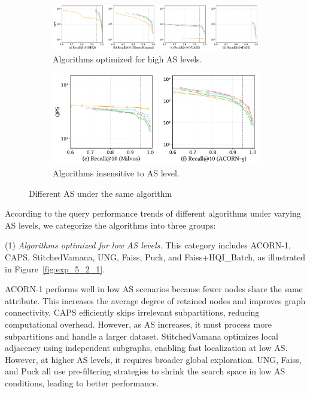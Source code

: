 \documentclass[sigconf, nonacm]{acmart}
\begin{document}
\begin{sloppypar}
\begin{figure}
    \begin{subfigure}{0.66\textwidth} %
        \centering
        \setlength{\abovecaptionskip}{0cm}
        \setlength{\belowcaptionskip}{0cm}
        \includegraphics[width=\textwidth]{figures/exp/exp_5_2_2.pdf}
        \caption{Algorithms optimized for high AS levels.}
        \label{fig:exp_5_2_2}
    \end{subfigure}
    \hfill %
    \begin{subfigure}{0.33\textwidth} %
        \centering
        \setlength{\abovecaptionskip}{0cm}
        \setlength{\belowcaptionskip}{0cm}
        \includegraphics[width=\textwidth]{figures/exp/exp_5_2_3.pdf}
        \caption{Algorithms insensitive to AS level.}
        \label{fig:exp_5_2_3}
    \end{subfigure}
    
    \setlength{\abovecaptionskip}{0cm}
    \setlength{\belowcaptionskip}{-0.4cm}
    \caption{Different AS under the same algorithm}
    \label{fig:exp_5_2_combined}
\end{figure}


According to the query performance trends of different algorithms under varying AS levels, we categorize the algorithms into three groups:

\par
(1) \textit{Algorithms optimized for low AS levels.}  
This category includes ACORN-1, CAPS, StitchedVamana, UNG, Faiss, Puck, and Faiss+HQI\_Batch, as illustrated in Figure~\ref{fig:exp_5_2_1}.

ACORN-1 performs well in low AS scenarios because fewer nodes share the same attribute. This increases the average degree of retained nodes and improves graph connectivity. CAPS efficiently skips irrelevant subpartitions, reducing computational overhead. However, as AS increases, it must process more subpartitions and handle a larger dataset. StitchedVamana optimizes local adjacency using independent subgraphs, enabling fast localization at low AS. However, at higher AS levels, it requires broader global exploration. UNG, Faiss, and Puck all use pre-filtering strategies to shrink the search space in low AS conditions, leading to better performance.


\end{sloppypar}
\end{document}
